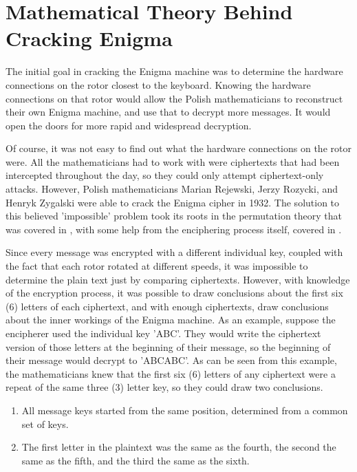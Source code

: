 \section{Mathematical Theory Behind Cracking Enigma}\label{sec:maththeory}

The initial goal in cracking the Enigma machine was to determine the hardware connections on the rotor closest to the keyboard. Knowing the hardware connections on that rotor would allow the Polish mathematicians to reconstruct their own Enigma machine, and use that to decrypt more messages. It would open the doors for more rapid and widespread decryption.

Of course, it was not easy to find out what the hardware connections on the rotor were. All the mathematicians had to work with were ciphertexts that had been intercepted throughout the day, so they could only attempt ciphertext-only attacks. However, Polish mathematicians Marian Rejewski, Jerzy Rozycki, and Henryk Zygalski were able to crack the Enigma cipher in 1932. The solution to this believed 'impossible' problem took its roots in the permutation theory that was covered in , with some help from the enciphering process itself, covered in .

Since every message was encrypted with a different individual key, coupled with the fact that each rotor rotated at different speeds, it was impossible to determine the plain text just by comparing ciphertexts. However, with knowledge of the encryption process, it was possible to draw conclusions about the first six (6) letters of each ciphertext, and with enough ciphertexts, draw conclusions about the inner workings of the Enigma machine. As an example, suppose the encipherer used the individual key 'ABC'. They would write the ciphertext version of those letters at the beginning of their message, so the beginning of their message would decrypt to 'ABCABC'. As can be seen from this example, the mathematicians knew that the first six (6) letters of any ciphertext were a repeat of the same three (3) letter key, so they could draw two conclusions.

\begin{enumerate}
\item All message keys started from the same position, determined from a common set of keys.
\item The first letter in the plaintext was the same as the fourth, the second the same as the fifth, and the third the same as the sixth.
\end{enumerate}

